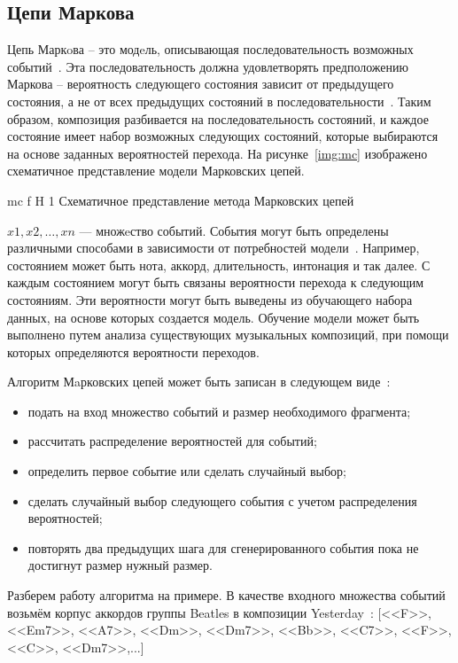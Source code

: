 \subsection{Цепи Маркова}
Цепь Маркoва -- это модeль, описывающая последовательность возможных событий~\cite{mchains}. 
Эта последовательность должна удовлетворять предположению Маркова -- вероятность следующего состояния зависит от предыдущего состояния, а не от всех предыдущих состояний в последовательности~\cite{mchains}. 
Таким образом, композиция разбивается на последовательность состояний, и каждое состояние имеет набор возможных следующих состояний, которые выбираются на основе заданных вероятностей перехода. 
На рисунке~\ref{img:mc} изображено схематичное представление модели Марковских цепей.

{mc}
{f}
{H}
{1\textwidth}
{Схематичное представление метода Марковских цепей}


${x1, x2, …, xn}$ --- множeство событий. События могут быть определены различными способами в зависимости от потребностей модели~\cite{mchains}. 
Например, состоянием может быть нота, аккорд, длительность, интонация и так далее.  С каждым состоянием могут быть связаны вероятности перехода к следующим состояниям.
Эти вероятности могут быть выведены из обучающего набора данных, на основе которых создается модель.
Обучение модели может быть выполнено путем анализа существующих музыкальных композиций, при помощи которых определяются вероятности переходов.

Алгоритм Мaрковских цепей может быть записан в следующем виде~\cite{markov}:
\begin{itemize}
	\item подать на вход множество событий и размер необходимого фрагмента;
	\item рассчитать распределение вероятностей для событий;
	\item определить первое событие или сделать случайный выбор;
	\item сделать случайный выбор следующего события с учетом распределения вероятностей;
	\item повторять два предыдущих шага для сгенерированного события пока не достигнут размер нужный размер.
\end{itemize}

Разберем работу алгоритма на примере. В качестве входного множества событий возьмём корпус аккордов группы Beatles в композиции Yesterday~\cite{yestrday}:
[<<F>>, <<Em7>>, <<A7>>, <<Dm>>, <<Dm7>>, <<Bb>>, <<C7>>, <<F>>, <<C>>, <<Dm7>>,...]

